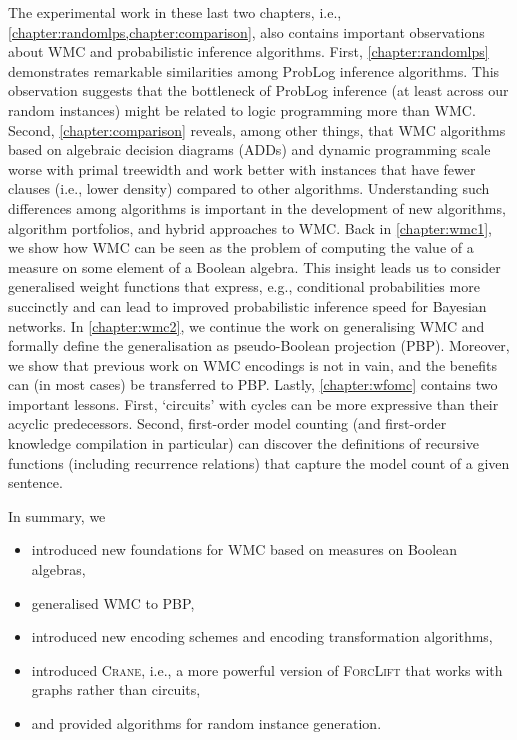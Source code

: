 
The experimental work in these last two chapters, i.e.,
\cref{chapter:randomlps,chapter:comparison}, also contains important
observations about WMC and probabilistic inference algorithms. First,
\cref{chapter:randomlps} demonstrates remarkable similarities among ProbLog
inference algorithms. This observation suggests that the bottleneck of ProbLog
inference (at least across our random instances) might be related to logic
programming more than WMC\@. Second, \cref{chapter:comparison} reveals, among
other things, that WMC algorithms based on algebraic decision diagrams (ADDs)
and dynamic programming scale worse with primal treewidth and work better with
instances that have fewer clauses (i.e., lower density) compared to other
algorithms. Understanding such differences among algorithms is important in the
development of new algorithms, algorithm portfolios, and hybrid approaches to
WMC\@. Back in \cref{chapter:wmc1}, we show how WMC can be seen as the problem
of computing the value of a measure on some element of a Boolean algebra. This
insight leads us to consider generalised weight functions that express, e.g.,
conditional probabilities more succinctly and can lead to improved probabilistic
inference speed for Bayesian networks. In \cref{chapter:wmc2}, we continue the
work on generalising WMC and formally define the generalisation as
pseudo-Boolean projection (PBP). Moreover, we show that previous work on WMC
encodings is not in vain, and the benefits can (in most cases) be transferred to
PBP\@. Lastly, \cref{chapter:wfomc} contains two important lessons. First,
`circuits' with cycles can be more expressive than their acyclic predecessors.
Second, first-order model counting (and first-order knowledge compilation in
particular) can discover the definitions of recursive functions (including
recurrence relations) that capture the model count of a given sentence.

In summary, we
\begin{itemize}
  \item introduced new foundations for WMC based on measures on Boolean
        algebras,
  \item generalised WMC to PBP,
  \item introduced new encoding schemes and encoding transformation algorithms,
  \item introduced \textsc{Crane}, i.e., a more powerful version of
        \textsc{ForcLift} that works with graphs rather than circuits,
  \item and provided algorithms for random instance generation.
\end{itemize}


